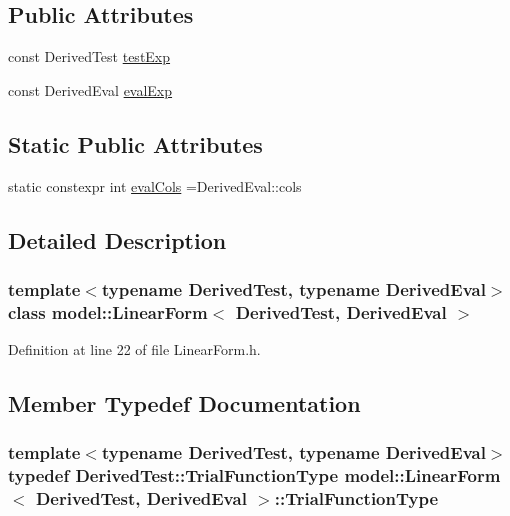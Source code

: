 \subsection*{Public Attributes}
\begin{DoxyCompactItemize}
\item 
const Derived\+Test \hyperlink{classmodel_1_1_linear_form_aeeaabdba14b8723c7bd158c7c14e7ce5}{test\+Exp}
\item 
const Derived\+Eval \hyperlink{classmodel_1_1_linear_form_a06d51fa5037e2f3859d6669e14de8ede}{eval\+Exp}
\end{DoxyCompactItemize}
\subsection*{Static Public Attributes}
\begin{DoxyCompactItemize}
\item 
static constexpr int \hyperlink{classmodel_1_1_linear_form_a0e22c8a17afa5808bdb5b24d439bc098}{eval\+Cols} =Derived\+Eval\+::cols
\end{DoxyCompactItemize}


\subsection{Detailed Description}
\subsubsection*{template$<$typename Derived\+Test, typename Derived\+Eval$>$class model\+::\+Linear\+Form$<$ Derived\+Test, Derived\+Eval $>$}



Definition at line 22 of file Linear\+Form.\+h.



\subsection{Member Typedef Documentation}
\hypertarget{classmodel_1_1_linear_form_a3b9ee10b33ce5fc4c69b3370704934b8}{}
\subsubsection[{Trial\+Function\+Type}]{\setlength{\rightskip}{0pt plus 5cm}template$<$typename Derived\+Test, typename Derived\+Eval$>$ typedef Derived\+Test\+::\+Trial\+Function\+Type {\bf model\+::\+Linear\+Form}$<$ Derived\+Test, Derived\+Eval $>$\+::{\bf Trial\+Function\+Type}}\label{classmodel_1_1_linear_form_a3b9ee10b33ce5fc4c69b3370704934b8}


